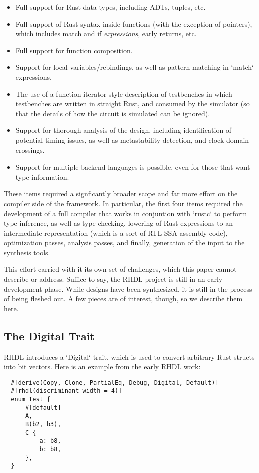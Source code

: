 \documentclass[conference]{IEEEtran}
\begin{document}
\begin{itemize}
  \item Full support for Rust data types, including ADTs, tuples, etc.
  \item Full support of Rust syntax inside functions (with the exception of pointers), which includes 
  match and if \emph{expressions}, early returns, etc.
  \item Full support for function composition.
  \item Support for local variables/rebindings, as well as pattern matching in `match` expressions.
  \item The use of a function iterator-style description of testbenches in which testbenches are written in 
  straight Rust, and consumed by the simulator (so that the details of how the circuit is simulated can be ignored).
  \item Support for thorough analysis of the design, including identification of potential timing issues, as well as
  metastability detection, and clock domain crossings.
  \item Support for multiple backend languages is possible, even for those that want type information.
\end{itemize}

These items required a signficantly broader scope and far more effort on the compiler side of the framework.  In particular,
the first four items required the development of a full compiler that works in conjuntion with `rustc` to perform
type inference, as well as type checking, lowering of Rust expressions to an intermediate representation (which is a sort of
RTL-SSA assembly code), optimization passes, analysis passes, and finally, generation of the input to the synthesis tools.

This effort carried with it its own set of challenges, which this paper cannot describe or address.  Suffice to say, the RHDL
project is still in an early development phase.  While designs have been synthesized, it is still in the process of being
fleshed out.  A few pieces are of interest, though, so we describe them here.

\subsection{The Digital Trait}
RHDL introduces a `Digital` trait, which is used to convert arbitrary Rust structs into bit vectors.  Here is an example from
the early RHDL work:

\begin{verbatim}
  #[derive(Copy, Clone, PartialEq, Debug, Digital, Default)]
  #[rhdl(discriminant_width = 4)]
  enum Test {
      #[default]
      A,
      B(b2, b3),
      C {
          a: b8,
          b: b8,
      },
  }
\end{verbatim}
\end{document}
